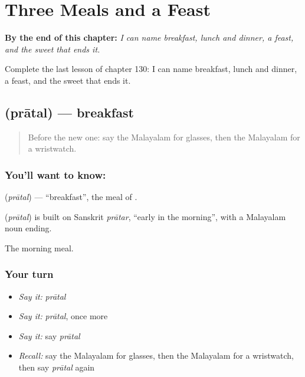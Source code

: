 
\chapter{Three Meals and a Feast}
\label{ch:ml-three-meals-and-a-feast}

\begin{chapteropening}
\textbf{By the end of this chapter:} \emph{I can name breakfast, lunch and dinner, a feast, and the sweet that ends it.}

Complete the last lesson of chapter 130: I can name breakfast, lunch and dinner, a feast, and the sweet that ends it.
\end{chapteropening}

\section[\texorpdfstring{\ml{പ്രാതൽ} (prātal)}{പ്രാതൽ (prātal)}]{ (prātal) — breakfast}

\label{lesson:ML-C130-breakfast}



\begin{quote}
Before the new one: say the Malayalam for glasses, then the Malayalam for a wristwatch.
\end{quote}

\subsection*{You'll want to know: }
\textbf{} (\emph{prātal}) — \textquotedblleft{}breakfast\textquotedblright{}, the meal of \textbf{}.

\begin{cousinweb}
\textbf{} (\emph{prātal}) is built on Sanskrit \emph{prātar}, \textquotedblleft{}early in the morning\textquotedblright{}, with a Malayalam noun ending.
\end{cousinweb}

\begin{grammarlens}[title={What you've built}]
The morning meal.
\end{grammarlens}

\subsection*{Your turn}
\begin{itemize}
\raggedright
  \item \emph{Say it:} \emph{prātal}
  \item \emph{Say it:} \emph{prātal}, once more
  \item \emph{Say it:} say \emph{prātal}
  \item \emph{Recall:} say the Malayalam for glasses, then the Malayalam for a wristwatch, then say \emph{prātal} again
\end{itemize}

